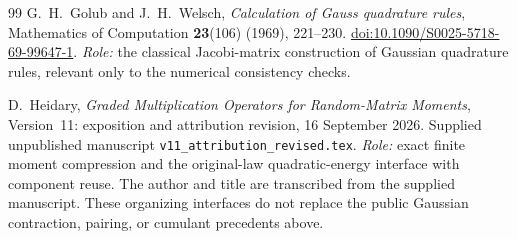 \documentclass[11pt]{article}
\numberwithin{equation}{section}
\theoremstyle{definition}\newtheorem{definition}[theorem]{Definition}
\theoremstyle{remark}\newtheorem{remark}[theorem]{Remark}
\begin{document}
\begin{thebibliography}{99}
G.~H.~Golub and J.~H.~Welsch,
\emph{Calculation of Gauss quadrature rules},
Mathematics of Computation \textbf{23}(106) (1969), 221--230.
\href{https://doi.org/10.1090/S0025-5718-69-99647-1}{doi:10.1090/S0025-5718-69-99647-1}.
\textit{Role:} the classical Jacobi-matrix construction of Gaussian quadrature
rules, relevant only to the numerical consistency checks.

D.~Heidary,
\emph{Graded Multiplication Operators for Random-Matrix Moments},
Version~11: exposition and attribution revision, 16 September 2026.
Supplied unpublished manuscript \texttt{v11\_attribution\_revised.tex}.
\textit{Role:} exact finite moment compression and the original-law
quadratic-energy interface with component reuse. The author and title are
transcribed from the supplied manuscript. These organizing interfaces do not
replace the public Gaussian contraction, pairing, or cumulant precedents above.
\end{thebibliography}
\end{document}
